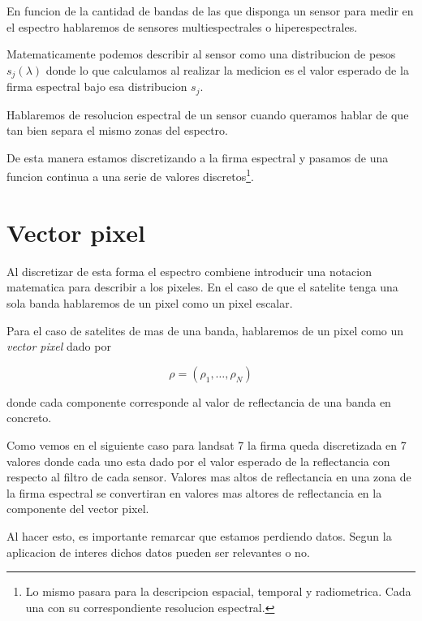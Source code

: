 \begin{obs}
  En funcion de la cantidad de bandas de las que disponga un sensor para medir
  en el espectro hablaremos de sensores multiespectrales o hiperespectrales.
\end{obs}

Matematicamente podemos describir al sensor como una distribucion de pesos
$s_j(\lambda)$ donde lo que calculamos al realizar la medicion es el valor
esperado de la firma espectral bajo esa distribucion $s_j$.

\begin{obs}
  Hablaremos de resolucion espectral de un sensor cuando queramos hablar de que
  tan bien separa el mismo zonas del espectro.
\end{obs}

De esta manera estamos discretizando a la firma espectral y pasamos de una
funcion continua a una serie de valores discretos\footnote{Lo mismo pasara
para la descripcion espacial, temporal y radiometrica. Cada una con su
correspondiente resolucion espectral.}.

\section{Vector pixel}

Al discretizar de esta forma el espectro combiene introducir una notacion
matematica para describir a los pixeles. En el caso de que el satelite tenga una
sola banda hablaremos de un pixel como un pixel escalar.

Para el caso de satelites de mas de una banda, hablaremos de un pixel como un
\emph{vector pixel} dado por

\begin{equation}
  \rho = (\rho_1, \ldots, \rho_N)
\end{equation}

donde cada componente corresponde al valor de reflectancia de una banda en
concreto.

Como vemos en el siguiente caso para landsat 7 la firma queda discretizada en 7
valores donde cada uno esta dado por el valor esperado de la reflectancia con
respecto al filtro de cada sensor. Valores mas altos de reflectancia en una zona
de la firma espectral se convertiran en valores mas altores de reflectancia en
la componente del vector pixel.

Al hacer esto, es importante remarcar que estamos perdiendo datos. Segun la
aplicacion de interes dichos datos pueden ser relevantes o no.

